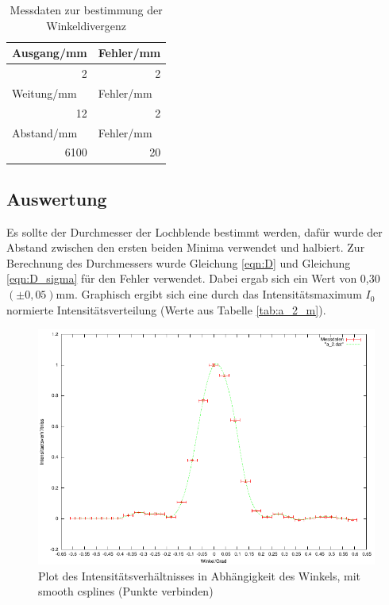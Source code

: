 \documentclass[12pt]{scrartcl}
\begin{document}
\begin{table}[H]
\caption{Messdaten zur bestimmung der Winkeldivergenz}
\begin{center}
\begin{tabular}{|l|l|}
\hline
Ausgang/mm & Fehler/mm \\ \hline
\multicolumn{1}{|r|}{2} & \multicolumn{1}{r|}{2} \\ \hline
Weitung/mm & Fehler/mm \\ \hline
\multicolumn{1}{|r|}{12} & \multicolumn{1}{r|}{2} \\ \hline
Abstand/mm & Fehler/mm \\ \hline
\multicolumn{1}{|r|}{6100} & \multicolumn{1}{r|}{20} \\ \hline
\end{tabular}
\end{center}
\label{tab:a_2_w}
\end{table}


\subsection{Auswertung}
Es sollte der Durchmesser der Lochblende bestimmt werden, dafür wurde der Abstand zwischen den ersten beiden Minima verwendet und halbiert. Zur Berechnung des Durchmessers wurde Gleichung \ref{eqn:D} und Gleichung \ref{eqn:D_sigma} für den Fehler verwendet. Dabei ergab sich ein Wert von 0,30 $(\pm 0,05)$mm. Graphisch ergibt sich eine durch das Intensitätsmaximum $I_0$ normierte Intensitätsverteilung (Werte aus Tabelle \ref{tab:a_2_m}).

\begin{figure}[H]
\centering
    \includegraphics[scale = 1]{a_2.pdf}
  	\caption[Plot des Intensitätsverhältnisses in Abhängigkeit des Winkels, mit smooth csplines (Punkte verbinden)]{Plot des Intensitätsverhältnisses in Abhängigkeit des Winkels, mit smooth csplines (Punkte verbinden)}
  \label{fig:a_2}
\end{figure}
\end{document}
